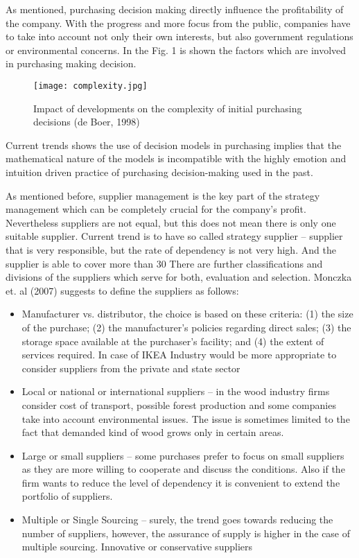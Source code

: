 \documentclass[oneside,12pt]{article}%
\begin{document}
As mentioned, purchasing decision making directly influence the profitability of the company. With the progress and more focus from the public, companies have to take into account not only their own interests, but also government regulations or environmental concerns. In the Fig. 1 is shown the factors which are involved in purchasing making decision.

\begin{figure}[ht!]
  \texttt{[image: complexity.jpg]}
  \caption{Impact of developments on the complexity of initial purchasing decisions (de Boer, 1998)}
\end{figure}

Current trends shows the use of decision models in purchasing implies that the mathematical nature of the models is incompatible with the highly emotion and intuition driven practice of purchasing decision-making used in the past.

As mentioned before, supplier management is the key part of the strategy management which can be completely crucial for the company’s profit. Nevertheless suppliers are not equal, but this does not mean there is only one suitable supplier. Current trend is to have so called strategy supplier – supplier that is very responsible, but the rate of dependency is not very high. And the supplier is able to cover more than 30%
There are further classifications and divisions of the suppliers which serve for both, evaluation and selection. Monczka et. al (2007) suggests to define the suppliers as follows:

\begin{itemize}
  \item Manufacturer vs. distributor, the choice is based on these criteria: (1) the size of the purchase; (2) the manufacturer’s policies regarding direct sales; (3) the storage space available at the purchaser’s facility; and (4) the extent of services required. In case of IKEA Industry would be more appropriate to consider suppliers from the private and state sector
  \item Local or national or international suppliers – in the wood industry firms consider cost of transport, possible forest production and some companies take into account environmental issues. The issue is sometimes limited to the fact that demanded kind of wood grows only in certain areas.
  \item Large or small suppliers – some purchases prefer to focus on small suppliers as they are more willing to cooperate and discuss the conditions. Also if the firm wants to reduce the level of dependency it is convenient to extend the portfolio of suppliers.
  \item Multiple or Single Sourcing – surely, the trend goes towards reducing the number of suppliers, however, the assurance of supply is higher in the case of multiple sourcing.
  Innovative or conservative suppliers
\end{itemize}
\end{document}
